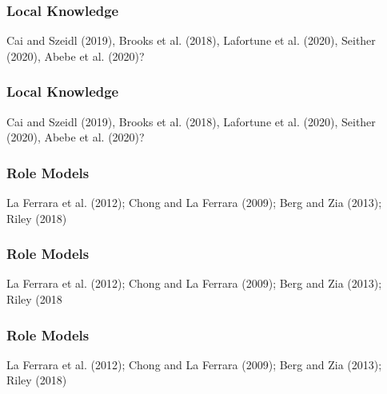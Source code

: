 \documentclass[hideothersubsections, usenames,dvipsnames,11pt]{beamer}
\newenvironment{itemize_3pt}{\itemize\addtolength{\itemsep}{3pt}}{\enditemize}
\begin{document}
\begin{frame}
\frametitle{Local Knowledge}
	\begin{itemize_3pt}
	\item Cai and Szeidl (2019), Brooks et al. (2018), Lafortune et al. (2020), Seither (2020), Abebe et al. (2020)?
	\vspace{0.1in}
	\end{itemize_3pt}
\end{frame}

\begin{frame}
\frametitle{Local Knowledge}
	\begin{itemize_3pt}
	\item Cai and Szeidl (2019), Brooks et al. (2018), Lafortune et al. (2020), Seither (2020), Abebe et al. (2020)?
	\vspace{0.1in}
	\end{itemize_3pt}
\end{frame}


\begin{frame}
\frametitle{Role Models}
	\begin{itemize_3pt}
	\item  La Ferrara et al. (2012); Chong and La Ferrara (2009); Berg and Zia (2013); Riley (2018)
	\vspace{0.1in}
	\end{itemize_3pt}
\end{frame}

\begin{frame}
\frametitle{Role Models}
	\begin{itemize_3pt}
	\item  La Ferrara et al. (2012); Chong and La Ferrara (2009); Berg and Zia (2013); Riley (2018
	\vspace{0.1in}
	\end{itemize_3pt}
\end{frame}

\begin{frame}
\frametitle{Role Models}
	\begin{itemize_3pt}
	\item  La Ferrara et al. (2012); Chong and La Ferrara (2009); Berg and Zia (2013); Riley (2018)
	\vspace{0.1in}
	\end{itemize_3pt}
\end{frame}


\end{document}
